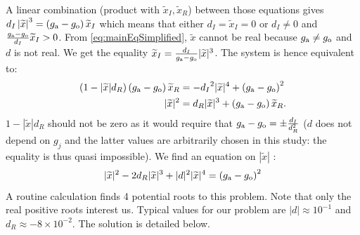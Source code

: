 A linear combination (product with ${\widetilde{x}_I}, \widetilde{x}_R$) between those equations
gives
${d_I}\left|\widetilde{x}\right|^3 = \left(g_{\rm a} - g_{\rm o}\right) {\widetilde{x}_I}$ which means that either ${d_I}=\widetilde{x}_I=0$ or ${d_I}\neq 0$ and $\frac{g_{\rm a} - g_{\rm o}}{{d_I}}{\widetilde{x}_I}>0$.
From \eqref{eq:mainEqSimplified}, $\widetilde{x}$ cannot be real because $g_{\rm a} \neq g_{\rm o}$ and $d$ is not real.
We get the equality
$\widetilde{x}_I = \frac{{d_I}}{g_{\rm a} - g_{\rm o}} |\widetilde{x}|^3$.
The system is hence equivalent to:
\begin{equation}
    \begin{aligned}
    \left(1 - |\widetilde{x}| d_R\right)
    \left(g_{\rm a} - g_{\rm o}\right)\widetilde{x}_R &=
    -{d_I}^2 |\widetilde{x}|^4 + \left(g_{\rm a} - g_{\rm o}\right)^2 \\
    |\widetilde{x}|^2 &=
    {d_R} |\widetilde{x}|^3 + \left(g_{\rm a} - g_{\rm o}\right)\widetilde{x}_R.
    \end{aligned}
\end{equation}
$1 - |\widetilde{x}| d_R$ should not be zero as it would require that $g_{\rm a} - g_{\rm o} = \pm \frac{d_I}{d_R^2}$ ($d$ does not depend on $g_j$ and the latter values are arbitrarily chosen in this study: the equality is thus quasi impossible).
We find an equation on $|\widetilde{x}|$ :
\begin{equation} \label{eq:mainPolynomial}
    |\widetilde{x}|^2 -  2{d_R} |\widetilde{x}|^3 + 
    |d|^2 |\widetilde{x}|^4
    =\left(g_{\rm a} - g_{\rm o}\right)^2
\end{equation}
A routine calculation finds 4 potential roots to this problem. Note that only the real positive roots interest us. Typical values for our problem 
are 
$|d| \approx 10^{-1}$ and $d_R \approx -8 \times 10^{-2}$.
The solution is detailed below.
